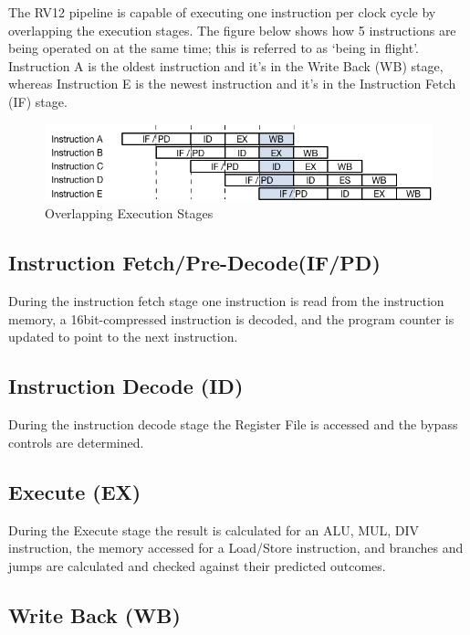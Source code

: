 The RV12 pipeline is capable of executing one instruction per clock cycle by overlapping the execution stages. 
The figure below shows how 5 instructions are being operated on at the same time; this is referred to as `being in flight'. 
Instruction A is the oldest instruction and it's in the Write Back (WB) stage, whereas Instruction E is the
newest instruction and it's in the Instruction Fetch (IF) stage.

\begin{figure}[hbt]
  \includegraphics{assets/img/Pipeline-Overlap}
  \caption{Overlapping Execution Stages}
\end{figure}

\subsection{Instruction Fetch/Pre-Decode(IF/PD)} \label{instruction-fetchpre-decode-ifpd}

During the instruction fetch stage one instruction is read from the instruction memory, a 16bit-compressed instruction is decoded, and the program counter is updated to point to the next instruction.

\subsection{Instruction Decode (ID)} \label{instruction-decode-id}

During the instruction decode stage the Register File is accessed and the bypass controls are determined.

\subsection{Execute (EX)} \label{execute-ex}

During the Execute stage the result is calculated for an ALU, MUL, DIV instruction, the memory accessed for a Load/Store instruction, and branches and jumps are calculated and checked against their predicted outcomes.

\subsection{Write Back (WB)} \label{write-back-wb}

